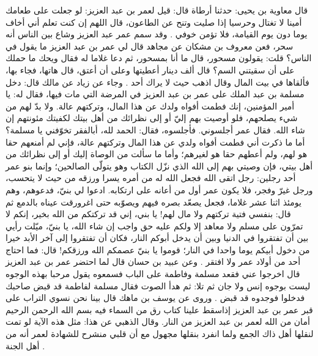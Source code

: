 قال معاوية بن يحيى: حدثنا أرطاة قال: قيل لعمر بن عبد العزيز: لو جعلت على طعامك أمينا لا تغتال وحرسيا إذا صليت وتنح عن الطاعون، قال اللهم إن كنت تعلم أني أخاف يوما دون يوم القيامة، فلا تؤمن خوفي \cite{dahabi_Siyar}. وقد سمم عمر عبد العزيز وشاع بين الناس أنه سحر، فعن معروف بن مشكان عن مجاهد قال لي عمر بن عبد العزيز ما يقول في الناس؟ قلت: يقولون مسحور، قال ما أنا بمسحور، ثم دعا غلاما له فقال ويحك ما حملك على أن سقيتني السم؟ قال ألف دينار أعطيتها وعلى أن أعتق، قال هاتها، فجاء بها، فألقاها في بيت المال وقال اذهب حيث لا يراك أحد \cite{dahabi_Siyar}. وجاء عن زياد عن مالك قال: دخل مسلمة بن عبد الملك على عمر بن عبد العزيز في المرضة التي مات فيها، فقال له: يا أمير المؤمنين، إنك فطمت أفواه ولدك عن هذا المال، وتركتهم عالة. ولا بدّ لهم من شيء يصلحهم، فلو أوصيت بهم إليّ أو إلى نظرائك من أهل بيتك لكفيتك مئونتهم إن شاء الله. فقال عمر أجلسوني. فأجلسوه، فقال: الحمد لله، أبالفقر تخوّفني يا مسلمة؟ أما ما ذكرت أني فطمت أفواه ولدي عن هذا المال وتركتهم عالة، فإني لم أمنعهم حقا هو لهم، ولم أعطهم حقا هو لغيرهم؛ وأما ما سألت من الوصاة إليك أو إلى نظرائك من أهل بيتي، فإن وصيتي بهم إلى الله الذي نزّل الكتاب وهو يتولّى الصالحين؛ وإنما بنو عمر أحد رجلين: رجل اتقى الله فجعل الله له من أمره يسرا ورزقه من حيث لا يتحسب، ورجل غيرّ وفجر، فلا يكون عمر أول من أعانه على ارتكابه. ادعوا لي بنيّ، فدعوهم، وهم يومئذ اثنا عشر غلاما، فجعل يصعّد بصره فيهم ويصوّبه حتى اغرورقت عيناه بالدمع ثم قال: بنفسي فتية تركتهم ولا مال لهم! يا بني، إني قد تركتكم من الله بخير، إنكم لا تمرّون على مسلم ولا معاهد إلا ولكم عليه حق واجب إن شاء الله، يا بنيّ، ميّلت رأيي بين أن تفتقروا في الدنيا وبين أن يدخل أبوكم النار، فكان أن تفتقروا إلى آخر الأبد خيرا من دخول أبيكم يوما واحدا في النار؛ قوموا يا بنيّ عصمكم الله ورزقكم! قال: فما احتاج أحد من أولاد عمر ولا افتقر \cite{ibnAbdRabbih_AlIqd}. وعن عبيد بن حسان قال لما احتضر عمر بن عبد العزيز قال اخرجوا عني فقعد مسلمة وفاطمة على الباب فسمعوه يقول مرحبا بهذه الوجوه ليست بوجوه إنس ولا جان ثم تلا: \quranayah*[28][83]{\footnotesize \surahname*[28]}  ثم هدأ الصوت فقال مسلمة لفاطمة قد قبض صاحبك فدخلوا فوجدوه قد قبض \cite{dahabi_Siyar}. وروى عن يوسف بن ماهك قال بينا نحن نسوي التراب على قبر عمر بن عبد العزيز إذاسقط علينا كتاب رق من السماء فيه بسم الله الرحمن الرحيم أمان من الله لعمر بن عبد العزيز من النار. وقال الذهبي عن هذا: مثل هذه الآية لو تمت لنقلها أهل ذاك الجمع ولما انفرد بنقلها مجهول مع أن قلبي منشرح للشهادة لعمر أنه من أهل الجنة \cite{dahabi_Siyar}.

